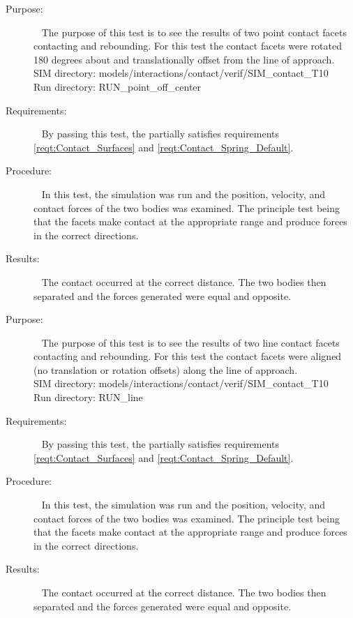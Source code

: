 \label{test:contact_03}
\begin{description}
\item[Purpose:] \ \newline
The purpose of this test is to see the results of two point contact facets contacting and rebounding. For this test the contact facets were rotated 180 degrees about and translationally offset from the line of approach.\\
SIM directory: models/interactions/contact/verif/SIM\_contact\_T10\\
Run directory: RUN\_point\_off\_center
\item[Requirements:] \ \newline
By passing this test, the \ModelDesc partially satisfies requirements \ref{reqt:Contact_Surfaces} and \ref{reqt:Contact_Spring_Default}.
\item[Procedure:]\ \newline
In this test, the simulation was run and the position, velocity, and contact forces of the two bodies was examined. The principle test being that the facets make contact at the appropriate range and produce forces in the correct directions.
\item[Results:]\ \newline
The contact occurred at the correct distance.  The two bodies then separated and the forces generated were equal and opposite.
\end{description}

\label{test:contact_04}
\begin{description}
\item[Purpose:] \ \newline
The purpose of this test is to see the results of two line contact facets contacting and rebounding. For this test the contact facets were aligned (no translation or rotation offsets) along the line of approach.\\
SIM directory: models/interactions/contact/verif/SIM\_contact\_T10\\
Run directory: RUN\_line
\item[Requirements:] \ \newline
By passing this test, the \ModelDesc partially satisfies requirements \ref{reqt:Contact_Surfaces} and \ref{reqt:Contact_Spring_Default}.
\item[Procedure:]\ \newline
In this test, the simulation was run and the position, velocity, and contact forces of the two bodies was examined. The principle test being that the facets make contact at the appropriate range and produce forces in the correct directions.
\item[Results:]\ \newline
The contact occurred at the correct distance.  The two bodies then separated and the forces generated were equal and opposite.
\end{description}

